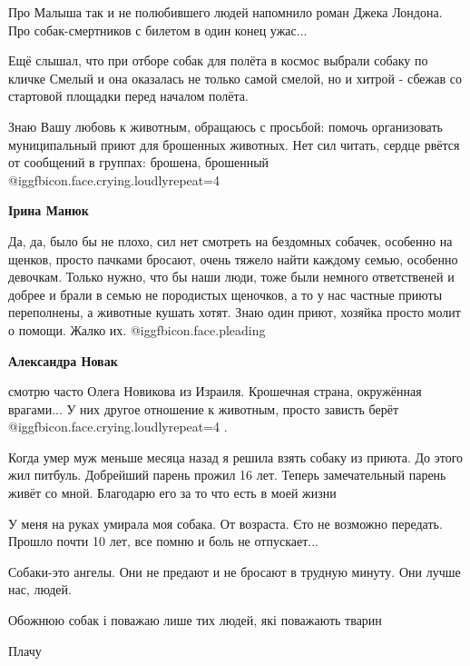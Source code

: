 \begin{itemize}

Про Малыша так и не полюбившего людей напомнило роман Джека Лондона. Про
собак-смертников с билетом в один конец ужас...

Ещё слышал, что при отборе собак для полёта в космос выбрали собаку по кличке
Смелый и она оказалась не только самой смелой, но и хитрой - сбежав со
стартовой площадки перед началом полёта.


Знаю Вашу любовь к животным, обращаюсь с просьбой: помочь организовать
муниципальный приют для брошенных животных. Нет сил читать, сердце рвётся от
сообщений в группах: брошена, брошенный @igg{fbicon.face.crying.loudly}{repeat=4} 

\begin{itemize} %
\textbf{Ірина Манюк} 

Да, да, было бы не плохо, сил нет смотреть на бездомных собачек, особенно на
щенков, просто пачками бросают, очень тяжело найти каждому семью, особенно
девочкам. Только нужно, что бы наши люди, тоже были немного ответственей и добрее
и брали в семью не породистых щеночков, а то у нас частные приюты переполнены, а
животные кушать хотят. Знаю один приют, хозяйка просто молит о помощи. Жалко
их. @igg{fbicon.face.pleading} 

\textbf{Александра Новак} 

смотрю часто Олега Новикова из Израиля. Крошечная страна, окружённая врагами...
У них другое отношение к животным, просто зависть берёт @igg{fbicon.face.crying.loudly}{repeat=4} .

\end{itemize} %


Когда умер муж меньше месяца назад я решила взять собаку из приюта. До этого
жил питбуль. Добрейший парень прожил 16 лет. Теперь замечательный парень живёт
со мной. Благодарю его за то что есть в моей жизни

У меня на руках умирала моя собака. От возраста. Єто не возможно передать. Прошло почти 10 лет, все помню и боль не отпускает...

Собаки-это ангелы. Они не предают и не бросают в трудную минуту. Они лучше нас, людей.

Обожнюю собак і поважаю лише тих людей, які поважають тварин

Плачу

\end{itemize} %
